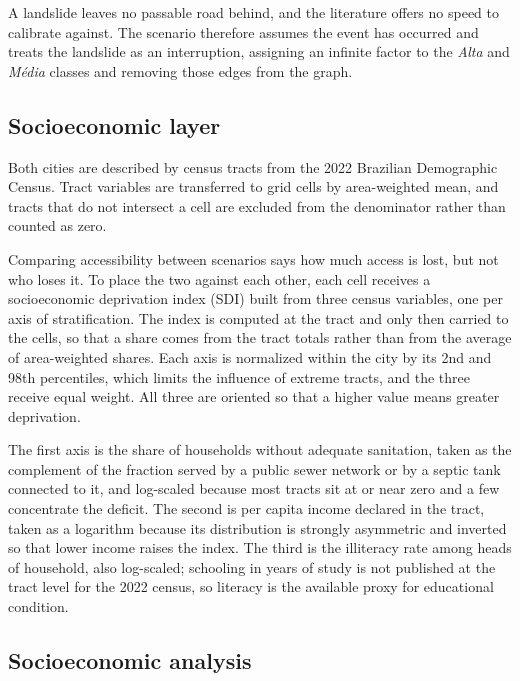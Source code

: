 A landslide leaves no passable road behind, and the literature offers no speed to calibrate against. The scenario therefore assumes the event has occurred and treats the landslide as an interruption, assigning an infinite factor to the \textit{Alta} and \textit{Média} classes and removing those edges from the graph.

\subsection{Socioeconomic layer}
\label{subsec:socioeconomic-layer}

Both cities are described by census tracts from the 2022 Brazilian Demographic Census. Tract variables are transferred to grid cells by area-weighted mean, and tracts that do not intersect a cell are excluded from the denominator rather than counted as zero.

Comparing accessibility between scenarios says how much access is lost, but not who loses it. To place the two against each other, each cell receives a socioeconomic deprivation index (SDI) built from three census variables, one per axis of stratification. The index is computed at the tract and only then carried to the cells, so that a share comes from the tract totals rather than from the average of area-weighted shares. Each axis is normalized within the city by its 2nd and 98th percentiles, which limits the influence of extreme tracts, and the three receive equal weight. All three are oriented so that a higher value means greater deprivation.

The first axis is the share of households without adequate sanitation, taken as the complement of the fraction served by a public sewer network or by a septic tank connected to it, and log-scaled because most tracts sit at or near zero and a few concentrate the deficit. The second is per capita income declared in the tract, taken as a logarithm because its distribution is strongly asymmetric and inverted so that lower income raises the index. The third is the illiteracy rate among heads of household, also log-scaled; schooling in years of study is not published at the tract level for the 2022 census, so literacy is the available proxy for educational condition.

\subsection{Socioeconomic analysis}
\label{subsec:socioeconomic-analysis}

